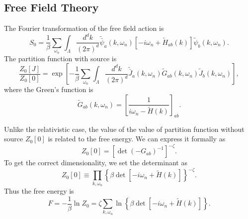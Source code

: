 \subsection{Free Field Theory}

The Fourier transformation of the free field action is
\begin{equation}
	S_0 = \frac{1}{\beta}\sum_{\omega_n} \int_{\Lambda} \frac{d^dk}{(2\pi)^d}
	\tilde{\bar{\psi}}_a(k,\omega_n)\left[-i\omega_n + \tilde{H}_{ab}(k)\right]\tilde{\psi}_b(k,\omega_n).
\end{equation}
The partition function with source is
\begin{equation}
	\frac{Z_0[J]}{Z_0[0]} = \exp\left[-\frac{1}{\beta}\sum_{\omega_n} \int_{\Lambda} \frac{d^dk}{(2\pi)^d}\tilde{\bar J}_a(k,\omega_n) \tilde{G}_{ab}(k,\omega_n) \tilde{J}_b(k,\omega_n) \right],
\end{equation}
where the Green's function is
\begin{equation}
	\tilde{G}_{ab}(k,\omega_n) = \left[\frac{1}{i\omega_n - \tilde{H}(k)}\right]_{ab}.
\end{equation}

Unlike the relativistic case, the value of the value of partition function without source $Z_0[0]$ is related to the free energy.
We can express it formally as
\begin{equation*}
	Z_0[0]= \left[\det (-G_{ab})^{-1}\right]^{-\zeta}.
\end{equation*}
To get the correct dimensionality, we set the determinant as
\begin{equation*}
	Z_0[0] \equiv \prod_{k,\omega_n}\left\{\beta \det\left[-i\omega_n+\tilde{H}(k)\right]\right\}^{-\zeta}.
\end{equation*}
Thus the free energy is
\begin{equation}
	F = -\frac{1}{\beta} \ln Z_0
	= \zeta \sum_{k,\omega_n} \ln\left\{\beta\det\left[-i\omega_n+\tilde{H}(k)\right]\right\}.
\end{equation}


